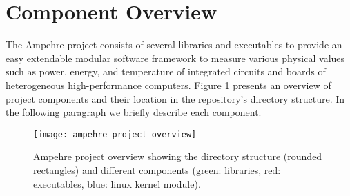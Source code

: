%
%
%
%
%
%

\section{Component Overview}
The Ampehre project consists of several libraries and executables to provide an easy extendable modular software framework to measure various physical values such as power, energy, and temperature of integrated circuits and boards of heterogeneous high-performance computers. Figure \ref{fig:ampehre_overview} presents an overview of project components and their location in the repository's directory structure. In the following paragraph we briefly describe each component.

\begin{figure}
\begin{center}
\texttt{[image: ampehre\_project\_overview]} 
\caption{Ampehre project overview showing the directory structure (rounded rectangles) and different components (green: libraries, red: executables, blue: linux kernel module).}
\label{fig:ampehre_overview}
\end{center}
\end{figure}

